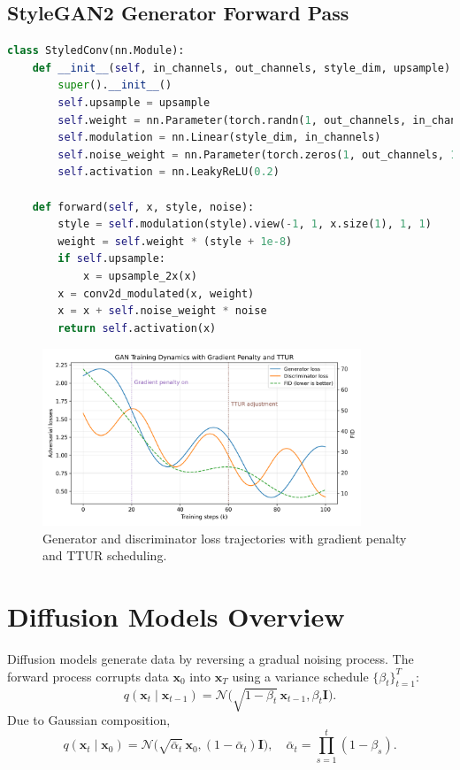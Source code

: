 \documentclass{article}
\begin{document}
\subsection{StyleGAN2 Generator Forward Pass}
\begin{lstlisting}[language=Python, caption={Simplified StyleGAN2 generator block with style modulation.}]
class StyledConv(nn.Module):
    def __init__(self, in_channels, out_channels, style_dim, upsample):
        super().__init__()
        self.upsample = upsample
        self.weight = nn.Parameter(torch.randn(1, out_channels, in_channels, 3, 3))
        self.modulation = nn.Linear(style_dim, in_channels)
        self.noise_weight = nn.Parameter(torch.zeros(1, out_channels, 1, 1))
        self.activation = nn.LeakyReLU(0.2)

    def forward(self, x, style, noise):
        style = self.modulation(style).view(-1, 1, x.size(1), 1, 1)
        weight = self.weight * (style + 1e-8)
        if self.upsample:
            x = upsample_2x(x)
        x = conv2d_modulated(x, weight)
        x = x + self.noise_weight * noise
        return self.activation(x)
\end{lstlisting}

\begin{figure}[H]
  \centering
  \includegraphics[width=0.85\textwidth]{gan_training_dynamics.png}
  \caption{Generator and discriminator loss trajectories with gradient penalty and TTUR scheduling.}
  \label{fig:gan_training_dynamics}
\end{figure}
\FloatBarrier

\section{Diffusion Models Overview}
Diffusion models generate data by reversing a gradual noising process. The forward process corrupts data $\mathbf{x}_0$ into $\mathbf{x}_T$ using a variance schedule $\{\beta_t\}_{t=1}^{T}$:
\begin{equation}
  q(\mathbf{x}_t \mid \mathbf{x}_{t-1}) = \mathcal{N}\bigl(\sqrt{1 - \beta_t}\,\mathbf{x}_{t-1}, \beta_t \mathbf{I}\bigr).
\end{equation}
Due to Gaussian composition,
\begin{equation}
  q(\mathbf{x}_t \mid \mathbf{x}_0) = \mathcal{N}\bigl(\sqrt{\bar{\alpha}_t}\,\mathbf{x}_0, (1 - \bar{\alpha}_t)\mathbf{I}\bigr), \quad \bar{\alpha}_t = \prod_{s=1}^{t} (1 - \beta_s).
\end{equation}
\end{document}
